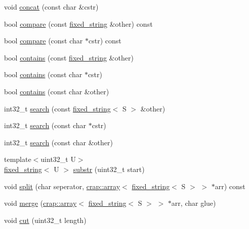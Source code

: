 \begin{DoxyCompactItemize}
\item 
void \hyperlink{classcrap_1_1fixed__string_a317561d172358b3a35c06c77632c0290}{concat} (const char \&cstr)
\item 
bool \hyperlink{classcrap_1_1fixed__string_aa660a4ad4b632fcdd2e432844c2c34bb}{compare} (const \hyperlink{classcrap_1_1fixed__string}{fixed\+\_\+string} \&other) const 
\item 
bool \hyperlink{classcrap_1_1fixed__string_ac2ea508b8a5d96ca464d4ba846ea9178}{compare} (const char $\ast$cstr) const 
\item 
bool \hyperlink{classcrap_1_1fixed__string_a6fff104e857a5a1902e2fa6da5e58e09}{contains} (const \hyperlink{classcrap_1_1fixed__string}{fixed\+\_\+string} \&other)
\item 
bool \hyperlink{classcrap_1_1fixed__string_a408f957e2bff5ebc528c01c8b36e6305}{contains} (const char $\ast$cstr)
\item 
bool \hyperlink{classcrap_1_1fixed__string_aeb58017b4ba9b976967e5f45a5feb54c}{contains} (const char \&other)
\item 
int32\+\_\+t \hyperlink{classcrap_1_1fixed__string_a4c667e91f2bbc93a4a86af6aaf4c3241}{search} (const \hyperlink{classcrap_1_1fixed__string}{fixed\+\_\+string}$<$ S $>$ \&other)
\item 
int32\+\_\+t \hyperlink{classcrap_1_1fixed__string_a327820b554cc195f0a8e07bff3fdf201}{search} (const char $\ast$cstr)
\item 
int32\+\_\+t \hyperlink{classcrap_1_1fixed__string_a956d096e6b73fdb3d43df8ce904111af}{search} (const char \&other)
\item 
{\footnotesize template$<$uint32\+\_\+t U$>$ }\\\hyperlink{classcrap_1_1fixed__string}{fixed\+\_\+string}$<$ U $>$ \hyperlink{classcrap_1_1fixed__string_aa37bba77464df33a4ea3b8b448054bed}{substr} (uint32\+\_\+t start)
\item 
void \hyperlink{classcrap_1_1fixed__string_a9469da3ecd583f01b8f5ca7db99ed4e4}{split} (char seperator, \hyperlink{classcrap_1_1array}{crap\+::array}$<$ \hyperlink{classcrap_1_1fixed__string}{fixed\+\_\+string}$<$ S $>$ $>$ $\ast$arr) const 
\item 
void \hyperlink{classcrap_1_1fixed__string_a5277a8b46ba19110a79edc89c7d146db}{merge} (\hyperlink{classcrap_1_1array}{crap\+::array}$<$ \hyperlink{classcrap_1_1fixed__string}{fixed\+\_\+string}$<$ S $>$ $>$ $\ast$arr, char glue)
\item 
void \hyperlink{classcrap_1_1fixed__string_ad69f2176cf70d1b1d09fcfeff2e7bc31}{cut} (uint32\+\_\+t length)

\end{DoxyCompactItemize}
